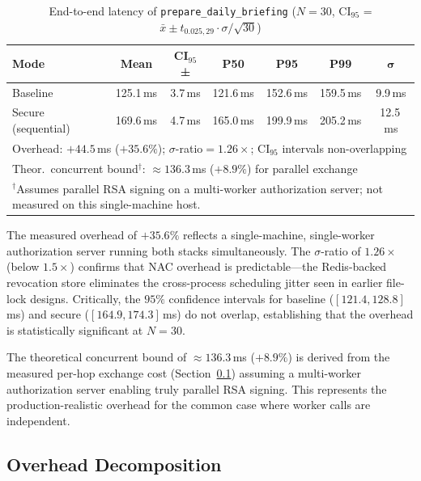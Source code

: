 \documentclass[journal]{IEEEtran}
\begin{document}
\begin{table}[h]
\caption{End-to-end latency of \texttt{prepare\_daily\_briefing} ($N=30$,
         CI$_{95}$ = $\bar{x} \pm t_{0.025,29}\cdot\sigma/\!\sqrt{30}$)}
\label{tab:latency}
\centering
\footnotesize
\setlength{\tabcolsep}{3pt}
\begin{tabular}{lcccccc}
\toprule
\textbf{Mode} & \textbf{Mean} & \textbf{CI}$_{95}$\textbf{±}
              & \textbf{P50} & \textbf{P95} & \textbf{P99}
              & $\boldsymbol\sigma$ \\
\midrule
Baseline            & 125.1\,ms & 3.7\,ms & 121.6\,ms & 152.6\,ms & 159.5\,ms & 9.9\,ms \\
Secure (sequential) & 169.6\,ms & 4.7\,ms & 165.0\,ms & 199.9\,ms & 205.2\,ms & 12.5\,ms \\
\midrule
\multicolumn{7}{l}{Overhead: $+44.5$\,ms ($+35.6\%$);\;
  $\sigma$-ratio\;$=1.26{\times}$;\; CI$_{95}$ intervals non-overlapping} \\
\multicolumn{7}{l}{Theor.\ concurrent bound$^\dagger$:
  $\approx 136.3$\,ms ($+8.9\%$) for parallel exchange} \\
\bottomrule
\multicolumn{7}{l}{\scriptsize
  $^\dagger$Assumes parallel RSA signing on a multi-worker authorization
  server; not measured on this single-machine host.}
\end{tabular}
\end{table}

The measured overhead of $+35.6\%$ reflects a single-machine, single-worker
authorization server running both stacks simultaneously. The $\sigma$-ratio of
$1.26\times$ (below $1.5\times$) confirms that NAC overhead is predictable---the
Redis-backed revocation store eliminates the cross-process scheduling jitter seen
in earlier file-lock designs. Critically, the $95\%$ confidence intervals for
baseline ($[121.4, 128.8]$\,ms) and secure ($[164.9, 174.3]$\,ms) do not overlap,
establishing that the overhead is statistically significant at $N=30$.

The theoretical concurrent bound of $\approx 136.3$\,ms ($+8.9\%$) is derived
from the measured per-hop exchange cost (Section~\ref{sec:overhead}) assuming a
multi-worker authorization server enabling truly parallel RSA signing. This
represents the production-realistic overhead for the common case where worker
calls are independent.

\subsection{Overhead Decomposition}
\label{sec:overhead}
\end{document}
